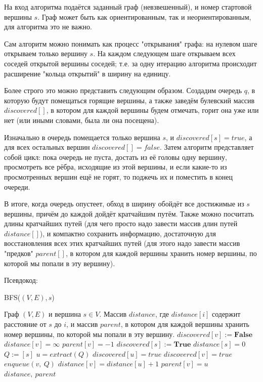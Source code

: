 \documentclass[a4paper,12pt]{article}
\newcommand{\algname}[1]{\textsc{#1}}
\begin{document}
На вход алгоритма подаётся заданный граф (невзвешенный), и номер стартовой вершины $s$. Граф может быть как ориентированным, так и неориентированным, для алгоритма это не важно.

Сам алгоритм можно понимать как процесс "открывания" графа: на нулевом шаге открываем только вершину $s$. На каждом следующем шаге открываем всех соседей открытой вершины соседей; т.е. за одну итерацию алгоритма происходит расширение "кольца открытий" в ширину на единицу.

Более строго это можно представить следующим образом. Создадим очередь $q$, в которую будут помещаться горящие вершины, а также заведём булевский массив $discovered[]$, в котором для каждой вершины будем отмечать, горит она уже или нет (или иными словами, была ли она посещена).

Изначально в очередь помещается только вершина $s$, и $discovered[s] = true$, а для всех остальных вершин $discovered[] = false$. Затем алгоритм представляет собой цикл: пока очередь не пуста, достать из её головы одну вершину, просмотреть все рёбра, исходящие из этой вершины, и если какие-то из просмотренных вершин ещё не горят, то поджечь их и поместить в конец очереди.

В итоге, когда очередь опустеет, обход в ширину обойдёт все достижимые из $s$ вершины, причём до каждой дойдёт кратчайшим путём. Также можно посчитать длины кратчайших путей (для чего просто надо завести массив длин путей $distance[]$), и компактно сохранить информацию, достаточную для восстановления всех этих кратчайших путей (для этого надо завести массив "предков" $parent[]$, в котором для каждой вершины хранить номер вершины, по которой мы попали в эту вершину).

Псевдокод:

\begin{algorithm}
  	\caption{\algname{BFS}($(V, E), s$)}
    \begin{algorithmic}
		\Require Граф $(V, E)$ и вершина $s \in V$.
		\Ensure Массив $distance$, где $distance[i]$ содержит расстояние от $s$ до $i$, и массив $parent$, в котором для каждой вершины хранить номер вершины, по которой мы попали в эту вершину.
			\State $discovered[v] := \textbf{False}$
			\State $distance[v] = \infty$
			\State $parent[v] = -1$
		\EndFor
		\State $discovered[s] := \textbf{True}$
		\State $distance[s] = 0$
        \State $Q := [s]$
            \State $u = extract(Q)$
            \State $discovered[u] = true$
                    \State $discovered[v] = true$
                    \State $enqueue(v,\ Q)$
                    \State $distance[v] = distance[u] + 1$
                    \State $parent[v] = u$
                \EndIf
            \EndFor
        \EndWhile
		\State
		\Return $distance,\ parent$
	\end{algorithmic}
\end{algorithm}
\end{document}
